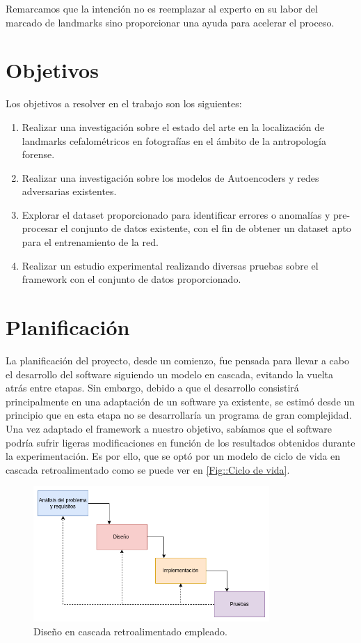 \noindent Remarcamos que la intención no es reemplazar al experto en su labor del marcado de landmarks sino proporcionar una ayuda para acelerar el proceso.

\section{Objetivos}

\noindent Los objetivos a resolver en el trabajo son los siguientes: 

\begin{enumerate}
    \item Realizar una investigación sobre el estado del arte en la localización de landmarks cefalométricos en fotografías en el ámbito de la antropología forense.
    \item Realizar una investigación sobre los modelos de Autoencoders y redes adversarias existentes.
    \item Explorar el dataset proporcionado para identificar errores o anomalías y pre-procesar el conjunto de datos existente, con el fin de obtener un dataset apto para el entrenamiento de la red.
    \item Realizar un estudio experimental realizando diversas pruebas sobre el framework con el conjunto de datos proporcionado.
\end{enumerate}

\section{Planificación}
    \noindent La planificación del proyecto, desde un comienzo, fue pensada para llevar a cabo el desarrollo del software siguiendo un modelo en cascada, evitando la vuelta atrás entre etapas. Sin embargo, debido a que el desarrollo consistirá principalmente en una adaptación de un software ya existente, se estimó desde un principio que en esta etapa no se desarrollaría un programa de gran complejidad. Una vez adaptado el framework a nuestro objetivo, sabíamos que el software podría sufrir ligeras modificaciones en función de los resultados obtenidos durante la experimentación. Es por ello, que se optó por un modelo de ciclo de vida en cascada retroalimentado como se puede ver en \autoref{Fig::Ciclo de vida}.


    \begin{figure}[!h]
        \centering
        \includegraphics[width=0.8\textwidth]{img/disenio_cascada.png}
        \caption{Diseño en cascada retroalimentado empleado.}
        \label{Fig::Ciclo de vida}
    \end{figure}

